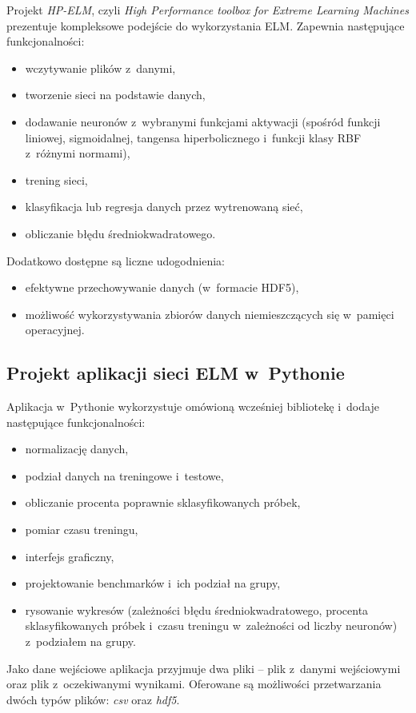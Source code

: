\documentclass{article}
\begin{document}
Projekt \textit{HP-ELM}, czyli \textit{High Performance toolbox for Extreme Learning Machines} prezentuje kompleksowe podejście do wykorzystania ELM. Zapewnia następujące funkcjonalności:
\begin{itemize}
\item wczytywanie plików z~danymi,
\item tworzenie sieci na podstawie danych,
\item dodawanie neuronów z~wybranymi funkcjami aktywacji (spośród funkcji liniowej, sigmoidalnej, tangensa hiperbolicznego i~funkcji klasy RBF z~różnymi normami),
\item trening sieci,
\item klasyfikacja lub regresja danych przez wytrenowaną sieć,
\item obliczanie błędu średniokwadratowego.
\end{itemize}
Dodatkowo dostępne są liczne udogodnienia:
\begin{itemize}
\item efektywne przechowywanie danych (w~formacie HDF5),
\item możliwość wykorzystywania zbiorów danych niemieszczących się w~pamięci operacyjnej.
\end{itemize}
\subsection{Projekt aplikacji sieci ELM w~Pythonie}
Aplikacja w~Pythonie wykorzystuje omówioną wcześniej bibliotekę i~dodaje następujące funkcjonalności:
\begin{itemize}
\item normalizację danych,
\item podział danych na treningowe i~testowe,
\item obliczanie procenta poprawnie sklasyfikowanych próbek,
\item pomiar czasu treningu,
\item interfejs graficzny,
\item projektowanie benchmarków i~ich podział na grupy,
\item rysowanie wykresów (zależności błędu średniokwadratowego, procenta sklasyfikowanych próbek i~czasu treningu w~zależności od liczby neuronów) z~podziałem na grupy.
\end{itemize}
Jako dane wejściowe aplikacja przyjmuje dwa pliki -- plik z~danymi wejściowymi oraz plik z~oczekiwanymi wynikami. Oferowane są możliwości przetwarzania dwóch typów plików: \textit{csv} oraz \textit{hdf5}. 
\end{document}
